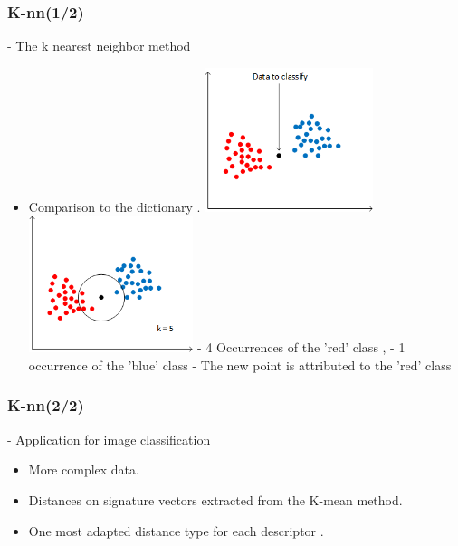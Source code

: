 \documentclass[xcolor=table]{beamer}
\begin{document}
\begin{frame}
\end{frame}


\begin{frame}\frametitle{K-nn(1/2)}

- The k nearest neighbor method

\begin{itemize}
\item<1-> Comparison to the dictionary .
 {\includegraphics[height=4.2cm]{knnwc.png}} %
 {\includegraphics[height=4cm]{knnac.png}
\newline - 4 Occurrences of the 'red' class , - 1 occurrence of the 'blue' class \newline - The new point is attributed to the 'red' class}
\end{itemize}

\end{frame}

\begin{frame}\frametitle{K-nn(2/2)}

- Application for image classification

\begin{itemize}
\item More complex data.
\item Distances on signature vectors extracted from the K-mean method.
\item One most adapted distance type for each descriptor .
\end{itemize}

\end{frame}
\end{document}
